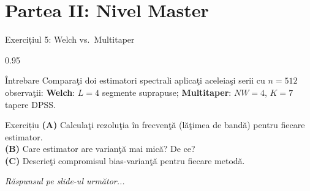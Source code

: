 \documentclass[9pt, aspectratio=169, t]{beamer}
\begin{document}
\section{Partea II: Nivel Master}

\begin{frame}{Exercițiul 5: Welch vs.\ Multitaper}
    \begin{cminipage}{0.95\textwidth}
    \begin{alertblock}{Întrebare}
        Comparaţi doi estimatori spectrali aplicaţi aceleiaşi serii cu $n = 512$ observaţii:
        \textbf{Welch}: $L = 4$ segmente suprapuse; \quad \textbf{Multitaper}: $NW = 4$, $K = 7$ tapere DPSS.
    \end{alertblock}

    \vspace{0.2cm}

    \begin{block}{Exercițiu}
        \textcolor{MainBlue}{\textbf{(A)}} Calculaţi rezoluţia în frecvenţă (lăţimea de bandă) pentru fiecare estimator.\\[3pt]
        \textcolor{MainBlue}{\textbf{(B)}} Care estimator are varianţă mai mică? De ce?\\[3pt]
        \textcolor{MainBlue}{\textbf{(C)}} Descrieţi compromisul bias-varianţă pentru fiecare metodă.
    \end{block}

    \vspace{0.3cm}

    \begin{center}
        \textit{Răspunsul pe slide-ul următor...}
    \end{center}
    \end{cminipage}
\end{frame}
\end{document}
